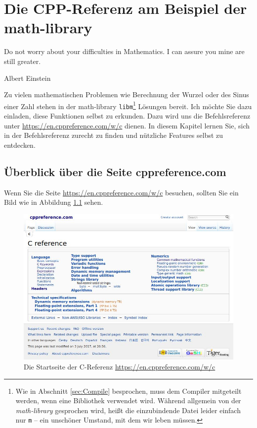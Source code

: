 \chapter{Die CPP-Referenz am Beispiel der math-library}
\epigraph{Do not worry about your difficulties in Mathematics. I can assure you mine are still greater.}{Albert Einstein}

Zu vielen mathematischen Problemen wie Berechnung der Wurzel oder des Sinus einer Zahl stehen in der math-library \texttt{libm}\footnote{Wie in Abschnitt \ref{sec:Compile} besprochen, muss dem Compiler mitgeteilt werden, wenn eine Bibliothek verwendet wird. Während allgemein von der \emph{math-library} gesprochen wird, heißt die einzubindende Datei leider einfach nur \texttt{m} -- ein unschöner Umstand, mit dem wir leben müssen.} Lösungen bereit. Ich möchte Sie dazu einladen, diese Funktionen selbst zu erkunden. Dazu wird uns die Befehlsreferenz unter \url{https://en.cppreference.com/w/c} dienen. In diesem Kapitel lernen Sie, sich in der Befehlsreferenz zurecht zu finden und nützliche Features selbst zu entdecken.

\section{Überblick über die Seite cppreference.com}
Wenn Sie die Seite \url{https://en.cppreference.com/w/c} besuchen, sollten Sie ein Bild wie in Abbildung \ref{fig:cpp-home} sehen.

\begin{figure}[h!]
	\includegraphics[width=\linewidth]{./gfx/cpp-home}
	\caption{Die Startseite der C-Referenz \url{https://en.cppreference.com/w/c}} \label{fig:cpp-home}
\end{figure}

